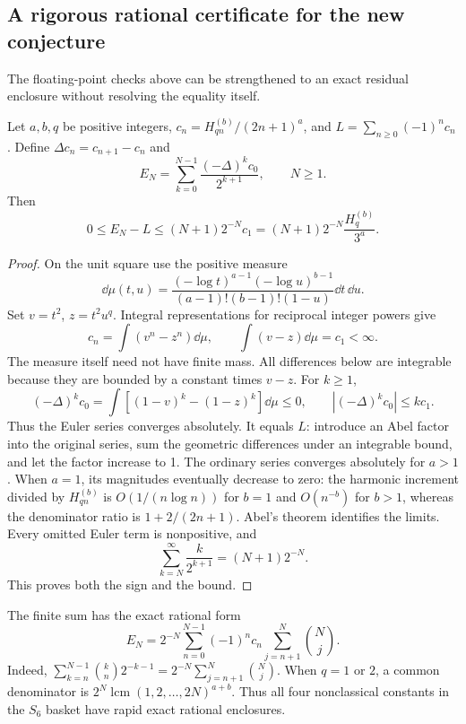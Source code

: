 \subsection{A rigorous rational certificate for the new conjecture}

The floating-point checks above can be strengthened to an exact
residual enclosure without resolving the equality itself.

\begin{theorem}\label{thm:euler-certificate}
Let \(a,b,q\) be positive integers,
\(c_n=H_{qn}^{(b)}/(2n+1)^a\), and
\(L=\sum_{n\geq0}(-1)^nc_n\).
Define \(\Delta c_n=c_{n+1}-c_n\) and
\[
 E_N=\sum_{k=0}^{N-1}\frac{(-\Delta)^k c_0}{2^{k+1}},
 \qquad N\geq1.
\]
Then
\begin{equation}\label{eq:euler-harmonic-bound}
 0\leq E_N-L\leq (N+1)2^{-N}c_1
     =(N+1)2^{-N}\frac{H_q^{(b)}}{3^a}.
\end{equation}
\end{theorem}

\begin{proof}
On the unit square use the positive measure
\[
 \dd\mu(t,u)=
 \frac{(-\log t)^{a-1}(-\log u)^{b-1}}
 {(a-1)!(b-1)!(1-u)}\dd t\,\dd u.
\]
Set \(v=t^2\), \(z=t^2u^q\). Integral representations for reciprocal
integer powers give
\[
 c_n=\int(v^n-z^n)\dd\mu,\qquad
 \int(v-z)\dd\mu=c_1<\infty.
\]
The measure itself need not have finite mass. All differences below
are integrable because they are bounded by a constant times \(v-z\).
For \(k\geq1\),
\[
 (-\Delta)^k c_0
 =\int[(1-v)^k-(1-z)^k]\dd\mu\leq0,\qquad
 |(-\Delta)^k c_0|\leq k c_1.
\]
Thus the Euler series converges absolutely.
It equals \(L\): introduce an Abel factor into the original series,
sum the geometric differences under an integrable bound, and let
the factor increase to 1. The ordinary series converges absolutely
for \(a>1\). When \(a=1\), its magnitudes eventually decrease to zero:
the harmonic increment divided by \(H_{qn}^{(b)}\) is
\(O(1/(n\log n))\) for \(b=1\) and \(O(n^{-b})\) for \(b>1\),
whereas the denominator ratio is \(1+2/(2n+1)\).
Abel's theorem identifies the limits.
Every omitted Euler term is nonpositive, and
\[
 \sum_{k=N}^{\infty}\frac{k}{2^{k+1}}=(N+1)2^{-N}.
\]
This proves both the sign and the bound.
\end{proof}

The finite sum has the exact rational form
\begin{equation}\label{eq:finite-euler-integer}
 E_N=2^{-N}\sum_{n=0}^{N-1}(-1)^nc_n
             \sum_{j=n+1}^{N}\binom Nj.
\end{equation}
Indeed,
\(\sum_{k=n}^{N-1}\binom{k}{n}2^{-k-1}
=2^{-N}\sum_{j=n+1}^{N}\binom Nj\).
When \(q=1\) or \(2\), a common denominator is
\(2^N\operatorname{lcm}(1,2,\ldots,2N)^{a+b}\).
Thus all four nonclassical constants in the \(S_6\) basket have
rapid exact rational enclosures.

